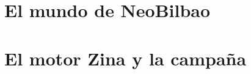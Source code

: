 \documentclass[10pt,a5paper,oneside]{book}
\begin{document}
\frontmatter

\tableofcontents

\mainmatter

\part{El mundo de NeoBilbao}







\part{El motor Zina y la campaña}




\end{document}
